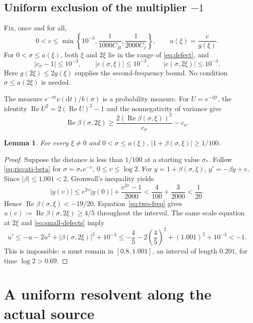\documentclass[11pt,letterpaper]{article}
\numberwithin{equation}{section}
\newtheorem{lemma}[theorem]{Lemma}
\theoremstyle{definition}
\theoremstyle{remark}
\newcommand{\Rea}{\operatorname{Re}}
\begin{document}
\subsection{Uniform exclusion of the multiplier \texorpdfstring{$-1$}{-1}}
Fix, once and for all,
\begin{equation}\label{eq:c-choice}
 0<c\le\min\left\{10^{-3},\frac1{1000C_B},\frac1{2000C_e}\right\},
 \qquad a(\xi)=\frac{c}{g(\xi)}.
\end{equation}
For $0<\sigma\le a(\xi)$, both $\xi$ and $2\xi$ lie in the range of
\eqref{eq:defect}, and
\begin{equation}\label{eq:small-defects}
 |c_\sigma-1|\le10^{-3},\qquad
 |e(\sigma,\xi)|\le10^{-3},\qquad
 |e(\sigma,2\xi)|\le10^{-3}.
\end{equation}
Here $g(2\xi)\le2g(\xi)$ supplies the second-frequency bound. No condition
$\sigma\le a(2\xi)$ is needed.

The measure $e^{-\sigma t}\nu(\mathrm dt)/b(\sigma)$ is a probability measure.
For $U=e^{-i\xi t}$, the identity $\Rea U^2=2(\Rea U)^2-1$ and the
nonnegativity of variance give
\begin{equation}\label{eq:two-freq}
 \Rea\beta(\sigma,2\xi)
 \ge\frac{2(\Rea\beta(\sigma,\xi))^2}{c_\sigma}-c_\sigma.
\end{equation}

\begin{lemma}\label{lem:exclusion}
For every $\xi\ne0$ and $0<\sigma\le a(\xi)$,
$|1+\beta(\sigma,\xi)|\ge1/100$.
\end{lemma}
\begin{proof}
Suppose the distance is less than $1/100$ at a starting value $\sigma_*$.
Follow \eqref{eq:riccati-beta} for $\sigma=\sigma_*e^{-v}$,
$0\le v\le\log2$. For $y=1+\beta(\sigma,\xi)$,
$y'=-\beta y+e$. Since $|\beta|\le1.001<2$, Gronwall's inequality yields
\[
 |y(v)|\le e^{2v}|y(0)|+\frac{e^{2v}-1}{2000}
 <\frac4{100}+\frac3{2000}<\frac1{20}.
\]
Hence $\Rea\beta(\sigma,\xi)<-19/20$. Equation~\eqref{eq:two-freq} gives
$u(v):=\Rea\beta(\sigma,2\xi)\ge4/5$ throughout the interval. The same
scale equation at $2\xi$ and \eqref{eq:small-defects} imply
\[
 u'\le-u-2u^2+|\beta(\sigma,2\xi)|^2+10^{-3}
 \le-\frac45-2\left(\frac45\right)^2+(1.001)^2+10^{-3}<-1.
\]
This is impossible: $u$ must remain in $[0.8,1.001]$, an interval of length
$0.201$, for time $\log2>0.69$.
\end{proof}

\section{A uniform resolvent along the actual source}\label{sec:resolvent}
\end{document}
